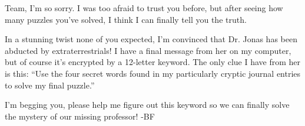 Team, I'm so sorry. I was too afraid to trust you before, but after
seeing how many puzzles you've solved, I think I can finally tell
you the truth.

In a stunning twist none of you expected, I'm convinced that Dr.
Jonas has been abducted by extraterrestrials! I have a final
message from her on my computer, but of course it's encrypted
by a 12-letter keyword. The only clue I have from her is this:
``Use the four secret words
found in my particularly cryptic journal entries to solve my final
puzzle.''

I'm begging you, please help me figure out this keyword
so we can finally solve the mystery of our missing
professor! -BF
